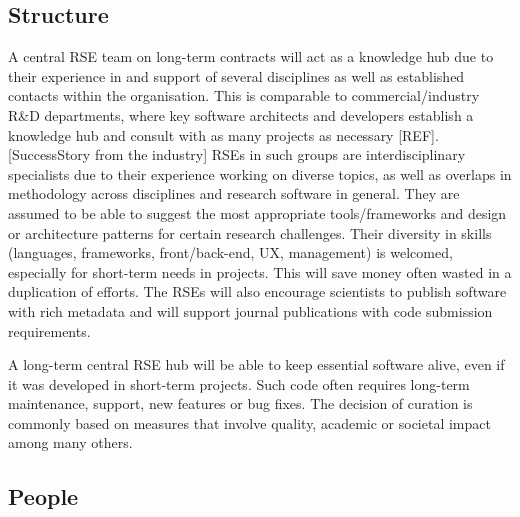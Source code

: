 \documentclass{article}
\begin{document}
\subsection{Structure}

A central RSE team on long-term contracts will act as a knowledge hub due to their experience in and support of several disciplines as well as established contacts within the organisation.
This is comparable to commercial/industry R\&D departments, where key software architects and developers establish a knowledge hub and consult with as many projects as necessary [REF].
[SuccessStory from the industry]
RSEs in such groups are interdisciplinary specialists due to their experience working on diverse topics, as well as overlaps in methodology across disciplines and research software in general. They are assumed to be able to suggest the most appropriate tools/frameworks and design or architecture patterns for certain research challenges. Their diversity in skills (languages, frameworks, front/back-end, UX, management) is welcomed, especially for short-term needs in projects. This will save money often wasted in a duplication of efforts.
The RSEs will also encourage scientists to publish software with rich metadata and will support journal publications with code submission requirements.

A long-term central RSE hub will be able to keep essential software alive, even if it was developed in short-term projects.
Such code often requires long-term maintenance, support, new features or bug fixes.
The decision of curation is commonly based on measures that involve quality, academic or societal impact among many others.

\subsection{People}
\end{document}
